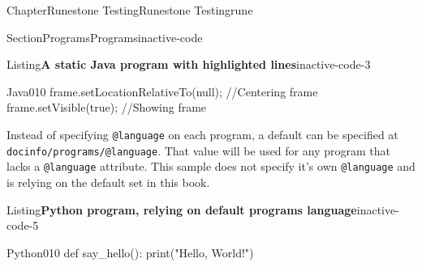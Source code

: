\documentclass[oneside,10pt,]{book}
\newcommand{\mono}[1]{\texttt{#1}}
\numberwithin{equation}{section}
\begin{document}
\begin{chapterptx}{Chapter}{Runestone Testing}{}{Runestone Testing}{}{}{rune}
\begin{sectionptx}{Section}{Programs}{}{Programs}{}{}{inactive-code}
\begin{listingptx}{Listing}{\textbf{A static Java program with highlighted lines}}{inactive-code-3}{}
\begin{programnumbered}{Java}{0}{1}{0}
{{        frame.setLocationRelativeTo(null);     //Centering frame
        frame.setVisible(true);                //Showing frame
    }
}
\end{programnumbered}
\end{listingptx}%
Instead of specifying \mono{@language} on each program, a default can be specified at \mono{docinfo/programs/@language}. That value will be used for any program that lacks a \mono{@language} attribute. This sample does not specify it's own \mono{@language} and is relying on the default set in this book.%
\begin{listingptx}{Listing}{\textbf{Python program, relying on default programs language}}{inactive-code-5}{}%
\begin{programnumbered}{Python}{0}{1}{0}
def say_hello():
    print("Hello, World!")


\end{programnumbered}
\end{listingptx}
\end{sectionptx}
\end{chapterptx}
\end{document}
